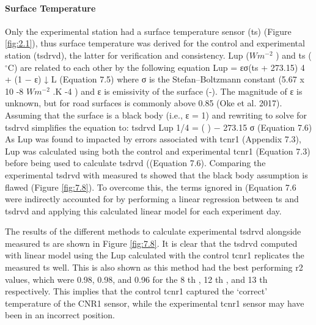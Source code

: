 \documentclass[final,3p,times,authoryear]{elsarticle}
\begin{document}
\paragraph{Surface Temperature}\label{sec:appendix7.4.2}

Only the experimental station had a surface temperature sensor (\gls{ts}) (Figure \ref{fig:2.1}), thus
surface temperature was derived for the control and experimental station (\gls{tsdrvd}), the
latter for verification and consistency. \gls{Lup} ($Wm^{-2}$ ) and \gls{ts} ($^{\circ}$C) are related to each other
by the following equation
\gls{Lup} = εσ(\gls{ts} + 273.15) 4 + (1 − ε) ↓ L
(Equation 7.5)
where σ is the Stefan–Boltzmann constant (5.67 x 10 -8 $Wm^{-2}$ .K -4 ) and ε is emissivity of
the surface (-). The magnitude of ε is unknown, but for road surfaces is commonly
above 0.85 (Oke et al. 2017). Assuming that the surface is a black body (i.e., ε = 1) and
rewriting to solve for \gls{tsdrvd} simplifies the equation to:
\gls{tsdrvd}
\gls{Lup} 1/4
= ( ) − 273.15
σ
(Equation 7.6)
As \gls{Lup} was found to impacted by errors associated with \gls{tcnr1} (Appendix 7.3), \gls{Lup} was
calculated using both the control and experimental \gls{tcnr1} (Equation 7.3) before being
used to calculate \gls{tsdrvd} ((Equation 7.6). Comparing the experimental \gls{tsdrvd} with
measured \gls{ts} showed that the black body assumption is flawed (Figure \ref{fig:7.8}). To
overcome this, the terms ignored in (Equation 7.6 were indirectly accounted for by
performing a linear regression between \gls{ts} and \gls{tsdrvd} and applying this calculated linear
model for each experiment day.

The results of the different methods to calculate experimental \gls{tsdrvd} alongside measured
\gls{ts} are shown in Figure \ref{fig:7.8}. It is clear that the \gls{tsdrvd} computed with linear model using
the \gls{Lup} calculated with the control \gls{tcnr1} replicates the measured \gls{ts} well. This is also
shown as this method had the best performing \gls{r2} values, which were 0.98, 0.98, and
0.96 for the 8 th , 12 th , and 13 th respectively. This implies that the control \gls{tcnr1} captured
the ‘correct' temperature of the CNR1 sensor, while the experimental \gls{tcnr1} sensor may
have been in an incorrect position.
\end{document}
